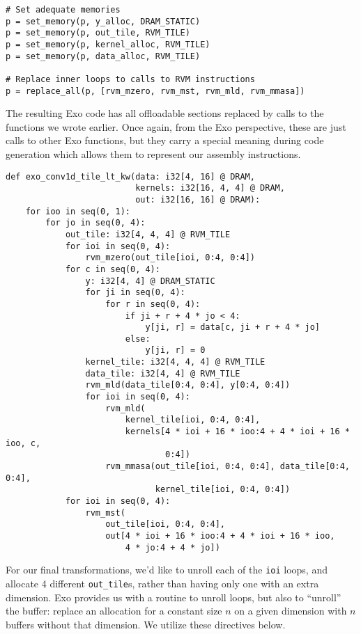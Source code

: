 \documentclass[acmsmall, nonacm=true]{acmart}
\begin{document}
\begin{verbatim}
# Set adequate memories
p = set_memory(p, y_alloc, DRAM_STATIC)
p = set_memory(p, out_tile, RVM_TILE)
p = set_memory(p, kernel_alloc, RVM_TILE)
p = set_memory(p, data_alloc, RVM_TILE)

# Replace inner loops to calls to RVM instructions
p = replace_all(p, [rvm_mzero, rvm_mst, rvm_mld, rvm_mmasa])
\end{verbatim}
The resulting Exo code has all offloadable sections replaced by calls to the functions we wrote earlier. Once again, from the Exo perspective, these are just calls to other Exo functions, but they carry a special meaning during code generation which allows them to represent our assembly instructions. 

\begin{verbatim}
def exo_conv1d_tile_lt_kw(data: i32[4, 16] @ DRAM,
                          kernels: i32[16, 4, 4] @ DRAM,
                          out: i32[16, 16] @ DRAM):
    for ioo in seq(0, 1):
        for jo in seq(0, 4):
            out_tile: i32[4, 4, 4] @ RVM_TILE
            for ioi in seq(0, 4):
                rvm_mzero(out_tile[ioi, 0:4, 0:4])
            for c in seq(0, 4):
                y: i32[4, 4] @ DRAM_STATIC
                for ji in seq(0, 4):
                    for r in seq(0, 4):
                        if ji + r + 4 * jo < 4:
                            y[ji, r] = data[c, ji + r + 4 * jo]
                        else:
                            y[ji, r] = 0
                kernel_tile: i32[4, 4, 4] @ RVM_TILE
                data_tile: i32[4, 4] @ RVM_TILE
                rvm_mld(data_tile[0:4, 0:4], y[0:4, 0:4])
                for ioi in seq(0, 4):
                    rvm_mld(
                        kernel_tile[ioi, 0:4, 0:4],
                        kernels[4 * ioi + 16 * ioo:4 + 4 * ioi + 16 * ioo, c,
                                0:4])
                    rvm_mmasa(out_tile[ioi, 0:4, 0:4], data_tile[0:4, 0:4],
                              kernel_tile[ioi, 0:4, 0:4])
            for ioi in seq(0, 4):
                rvm_mst(
                    out_tile[ioi, 0:4, 0:4],
                    out[4 * ioi + 16 * ioo:4 + 4 * ioi + 16 * ioo,
                        4 * jo:4 + 4 * jo])
\end{verbatim}

For our final transformations, we'd like to unroll each of the \verb|ioi| loops, and allocate 4 different \verb|out_tile|s, rather than having only one with an extra dimension. Exo provides us with a routine to unroll loops, but also to ``unroll'' the buffer: replace an allocation for a constant size $n$ on a given dimension with $n$ buffers without that dimension. We utilize these directives below.
\end{document}
